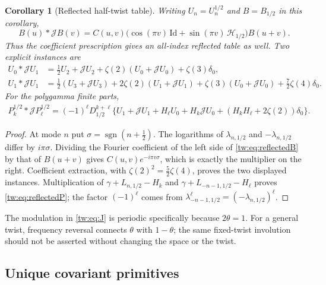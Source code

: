 \documentclass[11pt,letterpaper]{article}
\numberwithin{equation}{section}
\theoremstyle{plain}
\newtheorem{corollary}[theorem]{Corollary}
\theoremstyle{definition}
\theoremstyle{remark}
\begin{document}
\begin{corollary}[Reflected half-twist table]
\label{tw:cor:reflection}
Writing $U_n=U_n^{1/2}$ and $B=B_{1/2}$ in this corollary,
\begin{equation}\label{tw:eq:reflectedB}
 B(u)*\mathcal J B(v)
  =C(u,v)\bigl(\cos(\pi v)\,\mathrm{Id}
                   +\sin(\pi v)\,\mathcal H_{1/2}\bigr)B(u+v).
\end{equation}
Thus the coefficient prescription gives an all-index reflected
table as well. Two explicit instances are
\begin{align}
 U_0*\mathcal J U_1
  &=\tfrac12 U_2+\mathcal J U_2
        +\zeta(2)(U_0+\mathcal J U_0)+\zeta(3)\delta_0,
 \label{tw:eq:reflected01}\\
 U_1*\mathcal J U_1
  &=\tfrac12(U_3+\mathcal J U_3)
        +2\zeta(2)(U_1+\mathcal J U_1)
        +\zeta(3)(U_0+\mathcal J U_0)
        +\tfrac72\zeta(4)\delta_0.
 \label{tw:eq:reflected11}
\end{align}
For the polygamma finite parts,
\begin{align}
 P_k^{1/2}*\mathcal J P_\ell^{1/2}
 =(-1)^\ell D_{1/2}^{k+\ell}\bigl\{
     U_1+\mathcal J U_1+H_\ell U_0+H_k\mathcal J U_0
               +(H_kH_\ell+2\zeta(2))\delta_0\bigr\}.
 \label{tw:eq:reflectedP}
\end{align}
\end{corollary}

\begin{proof}
At mode $n$ put $\sigma=\operatorname{sgn}(n+\tfrac12)$. The
logarithms of $\lambda_{n,1/2}$ and $-\lambda_{n,1/2}$ differ by
$i\pi\sigma$. Dividing the Fourier coefficient of the left side
of \eqref{tw:eq:reflectedB} by that of $B(u+v)$ gives
$C(u,v)e^{-i\pi v\sigma}$, which is exactly the multiplier on
the right. Coefficient extraction, with
$\zeta(2)^2=\tfrac52\zeta(4)$, proves the two displayed
instances. Multiplication of
$\gamma+L_{n,1/2}-H_k$ and
$\gamma+L_{-n-1,1/2}-H_\ell$ proves
\eqref{tw:eq:reflectedP}; the factor $(-1)^\ell$ comes from
$\lambda_{-n-1,1/2}^{\ell}=(-\lambda_{n,1/2})^\ell$.
\end{proof}

The modulation in \eqref{tw:eq:J} is periodic specifically because
$2\theta=1$. For a general twist, frequency reversal connects
$\theta$ with $1-\theta$; the same fixed-twist involution should
not be asserted without changing the space or the twist.

\subsection{Unique covariant primitives}
\end{document}
